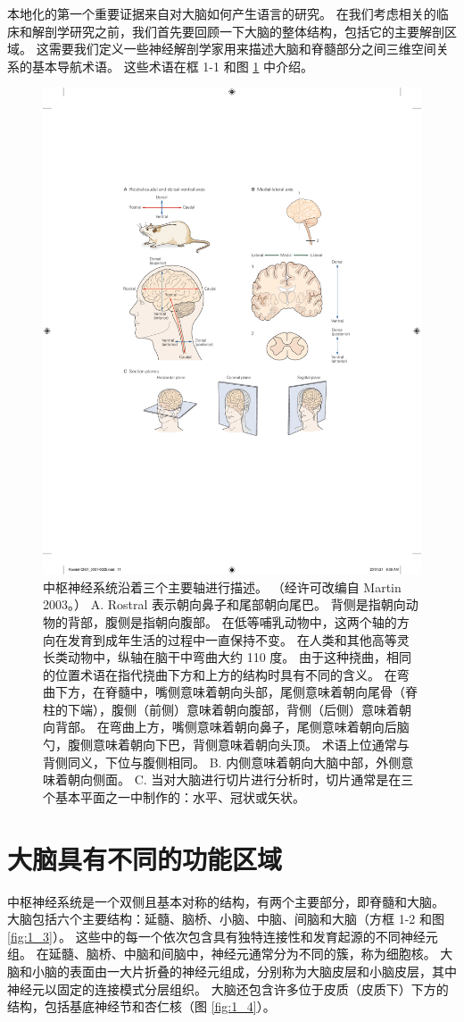本地化的第一个重要证据来自对大脑如何产生语言的研究。 
在我们考虑相关的临床和解剖学研究之前，我们首先要回顾一下大脑的整体结构，包括它的主要解剖区域。 
这需要我们定义一些神经解剖学家用来描述大脑和脊髓部分之间三维空间关系的基本导航术语。 
这些术语在框 1-1 和图 \ref{fig:1_2} 中介绍。

\begin{figure}[htbp]
	\centering
	\includegraphics[width=0.5\linewidth]{chap01/fig_1_2}
	\caption{中枢神经系统沿着三个主要轴进行描述。 
		（经许可改编自 Martin 2003。）
		A. Rostral 表示朝向鼻子和尾部朝向尾巴。 背侧是指朝向动物的背部，腹侧是指朝向腹部。 
		在低等哺乳动物中，这两个轴的方向在发育到成年生活的过程中一直保持不变。 
		在人类和其他高等灵长类动物中，纵轴在脑干中弯曲大约 110 度。 
		由于这种挠曲，相同的位置术语在指代挠曲下方和上方的结构时具有不同的含义。 
		在弯曲下方，在脊髓中，嘴侧意味着朝向头部，尾侧意味着朝向尾骨（脊柱的下端），腹侧（前侧）意味着朝向腹部，背侧（后侧）意味着朝向背部。 
		在弯曲上方，嘴侧意味着朝向鼻子，尾侧意味着朝向后脑勺，腹侧意味着朝向下巴，背侧意味着朝向头顶。
		术语上位通常与背侧同义，下位与腹侧相同。 
		B. 内侧意味着朝向大脑中部，外侧意味着朝向侧面。 
		C. 当对大脑进行切片进行分析时，切片通常是在三个基本平面之一中制作的：水平、冠状或矢状。}
	\label{fig:1_2}
\end{figure}


\section{大脑具有不同的功能区域}

中枢神经系统是一个双侧且基本对称的结构，有两个主要部分，即脊髓和大脑。 
大脑包括六个主要结构：延髓、脑桥、小脑、中脑、间脑和大脑（方框 1-2 和图 \ref{fig:1_3}）。 
这些中的每一个依次包含具有独特连接性和发育起源的不同神经元组。 
在延髓、脑桥、中脑和间脑中，神经元通常分为不同的簇，称为细胞核。 
大脑和小脑的表面由一大片折叠的神经元组成，分别称为大脑皮层和小脑皮层，其中神经元以固定的连接模式分层组织。 
大脑还包含许多位于皮质（皮质下）下方的结构，包括基底神经节和杏仁核（图 \ref{fig:1_4}）。

